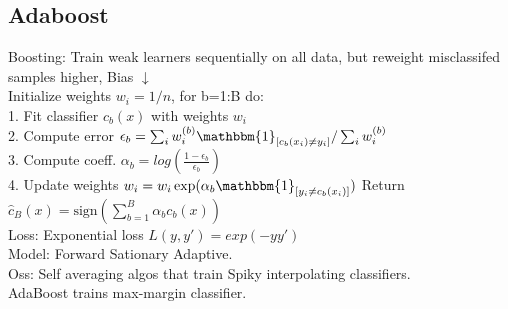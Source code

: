 \subsection*{Adaboost}
Boosting: Train weak learners sequentially on all data, but reweight misclassifed samples higher, Bias $\downarrow$\\
Initialize weights $w_i = 1/n$, for b=1:B do:\\
1. Fit classifier $c_b(x)$ with weights $w_i$\\
2. Compute error $\epsilon_b = \sum_i w_i^{(b)} \mathbbm{1}_{[c_b(x_i) \not = y_i]} / \sum_i w_i^{(b)}$\\
3. Compute coeff. $\alpha_b = log(\frac{1-\epsilon_b}{\epsilon_b})$\\
4. Update weights $w_i = w_i \exp(\alpha_b \mathbbm{1}_{[y_i \not = c_b(x_i)]})$
Return $\hat{c}_B(x) = \text{sign} \left ( \sum_{b=1}^B \alpha_b c_b(x) \right )$\\
Loss: Exponential loss $L(y,y')=exp(-yy')$\\
Model: Forward Sationary Adaptive.\\
Oss: Self averaging algos that train Spiky interpolating classifiers.\\
AdaBoost trains max-margin classifier.


